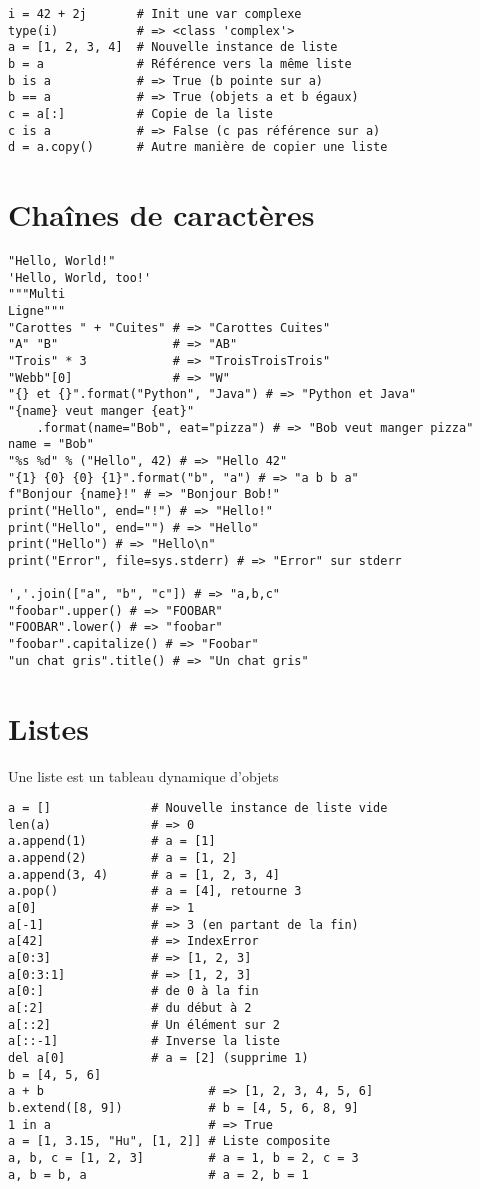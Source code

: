 \documentclass{article}
\begin{document}
\begin{multicols*}{4}
\begin{lstlisting}
i = 42 + 2j       # Init une var complexe
type(i)           # => <class 'complex'>
a = [1, 2, 3, 4]  # Nouvelle instance de liste 
b = a             # Référence vers la même liste
b is a            # => True (b pointe sur a)
b == a            # => True (objets a et b égaux)
c = a[:]          # Copie de la liste
c is a            # => False (c pas référence sur a)
d = a.copy()      # Autre manière de copier une liste
\end{lstlisting}

\section*{Chaînes de caractères}

\begin{lstlisting}
"Hello, World!"
'Hello, World, too!'
"""Multi 
Ligne"""
"Carottes " + "Cuites" # => "Carottes Cuites"
"A" "B"                # => "AB"
"Trois" * 3            # => "TroisTroisTrois"
"Webb"[0]              # => "W"
"{} et {}".format("Python", "Java") # => "Python et Java"
"{name} veut manger {eat}"
    .format(name="Bob", eat="pizza") # => "Bob veut manger pizza"
name = "Bob"
"%s %d" % ("Hello", 42) # => "Hello 42"
"{1} {0} {0} {1}".format("b", "a") # => "a b b a"
f"Bonjour {name}!" # => "Bonjour Bob!"
print("Hello", end="!") # => "Hello!"
print("Hello", end="") # => "Hello"
print("Hello") # => "Hello\n"
print("Error", file=sys.stderr) # => "Error" sur stderr 

','.join(["a", "b", "c"]) # => "a,b,c"
"foobar".upper() # => "FOOBAR"
"FOOBAR".lower() # => "foobar"
"foobar".capitalize() # => "Foobar"
"un chat gris".title() # => "Un chat gris"

\end{lstlisting}

\section*{Listes}
Une liste est un tableau dynamique d'objets
\begin{lstlisting}
a = []              # Nouvelle instance de liste vide
len(a)              # => 0
a.append(1)         # a = [1]
a.append(2)         # a = [1, 2]
a.append(3, 4)      # a = [1, 2, 3, 4]
a.pop()             # a = [4], retourne 3
a[0]                # => 1
a[-1]               # => 3 (en partant de la fin)
a[42]               # => IndexError
a[0:3]              # => [1, 2, 3]
a[0:3:1]            # => [1, 2, 3]
a[0:]               # de 0 à la fin
a[:2]               # du début à 2
a[::2]              # Un élément sur 2
a[::-1]             # Inverse la liste
del a[0]            # a = [2] (supprime 1)
b = [4, 5, 6]
a + b                       # => [1, 2, 3, 4, 5, 6]
b.extend([8, 9])            # b = [4, 5, 6, 8, 9]
1 in a                      # => True
a = [1, 3.15, "Hu", [1, 2]] # Liste composite
a, b, c = [1, 2, 3]         # a = 1, b = 2, c = 3
a, b = b, a                 # a = 2, b = 1
\end{lstlisting}


\end{multicols*}
\end{document}
